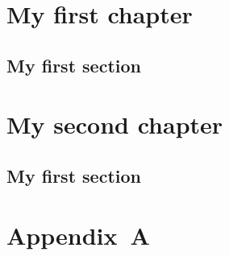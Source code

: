 \documentclass{book}
\begin{document}
\chapter{My first chapter}

\section{My first section}

\chapter{My second chapter}

\section{My first section}

\backmatter

\chapter{Appendix~A}

\lipsum[1-12]
\end{document}
